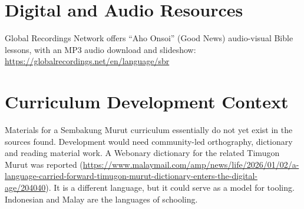 \documentclass[12pt]{article}
\begin{document}
\section{Digital and Audio Resources}
Global Recordings Network offers ``Aho Onsoi'' (Good News) audio-visual Bible lessons, with an MP3 audio download and slideshow: \url{https://globalrecordings.net/en/language/sbr}

\section{Curriculum Development Context}
Materials for a Sembakung Murut curriculum essentially do not yet exist in the sources found. Development would need community-led orthography, dictionary and reading material work. A Webonary dictionary for the related Timugon Murut was reported (\url{https://www.malaymail.com/amp/news/life/2026/01/02/a-language-carried-forward-timugon-murut-dictionary-enters-the-digital-age/204040}). It is a different language, but it could serve as a model for tooling. Indonesian and Malay are the languages of schooling.
\end{document}
